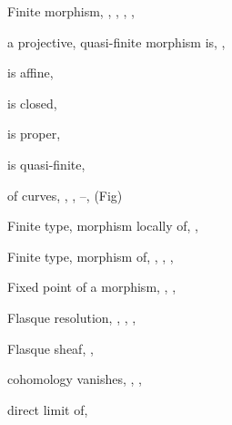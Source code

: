 {{\noindent\hspace*{0.0bp}Finite morphism, , , , , \par
\noindent\hspace*{7.5bp}a projective, quasi-finite morphism is, ,\par
\noindent\hspace*{15.0bp}\par
\noindent\hspace*{7.5bp}is affine, \par
\noindent\hspace*{7.5bp}is closed, \par
\noindent\hspace*{7.5bp}is proper, \par
\noindent\hspace*{7.5bp}is quasi-finite, \par
\noindent\hspace*{7.5bp}of curves, , , --,  (Fig)\par
\noindent\hspace*{0.0bp}Finite type, morphism locally of, , \par
\noindent\hspace*{0.0bp}Finite type, morphism of, , , , \par
}\hfill%
\parbox[t]{162.5bp}{\fontsize{8.05}{8.49}\selectfont%
\raggedright\setlength{\parskip}{0pt}%
\noindent\hspace*{0.0bp}Fixed point of a morphism, , , \par
\noindent\hspace*{0.0bp}Flasque resolution, , , , \par
\noindent\hspace*{0.0bp}Flasque sheaf, , \par
\noindent\hspace*{7.5bp}cohomology vanishes, , , \par
\noindent\hspace*{7.5bp}direct limit of, \par
}}
